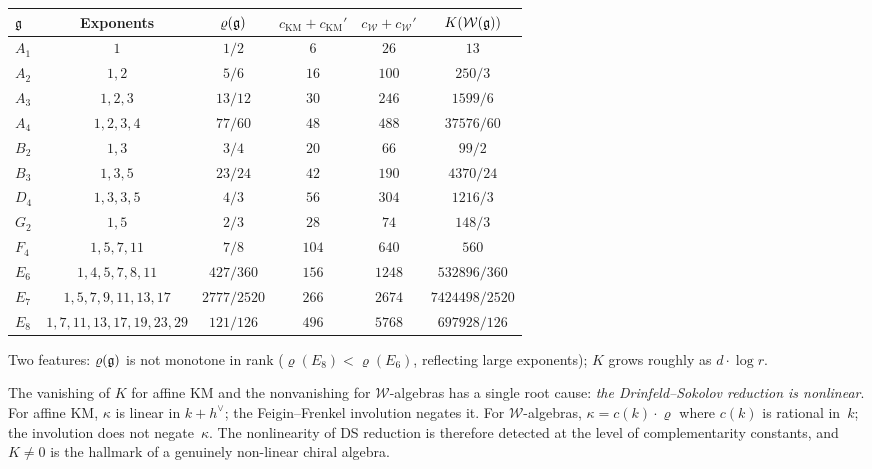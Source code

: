 \begin{computation}
\renewcommand{\arraystretch}{1.4}
\begin{center}
\begin{tabular}{lccccc}
\toprule
$\mathfrak{g}$ & Exponents & $\varrho(\mathfrak{g})$ & $c_{\mathrm{KM}}+c_{\mathrm{KM}}'$ &
$c_{\mathcal{W}}+c_{\mathcal{W}}'$ & $K(\mathcal{W}(\mathfrak{g}))$ \\
\midrule
$A_1$ & $1$ & $1/2$ & $6$ & $26$ & $13$ \\
$A_2$ & $1, 2$ & $5/6$ & $16$ & $100$ & $250/3$ \\
$A_3$ & $1, 2, 3$ & $13/12$ & $30$ & $246$ & $1599/6$ \\
$A_4$ & $1, 2, 3, 4$ & $77/60$ & $48$ & $488$ & $37576/60$ \\
$B_2$ & $1, 3$ & $3/4$ & $20$ & $66$ & $99/2$ \\
$B_3$ & $1, 3, 5$ & $23/24$ & $42$ & $190$ & $4370/24$ \\
$D_4$ & $1, 3, 3, 5$ & $4/3$ & $56$ & $304$ & $1216/3$ \\
$G_2$ & $1, 5$ & $2/3$ & $28$ & $74$ & $148/3$ \\
$F_4$ & $1, 5, 7, 11$ & $7/8$ & $104$ & $640$ & $560$ \\
$E_6$ & $1, 4, 5, 7, 8, 11$ & $427/360$ & $156$ & $1248$ & $532896/360$ \\
$E_7$ & $1, 5, 7, 9, 11, 13, 17$ & $2777/2520$ & $266$ & $2674$ & $7424498/2520$ \\
$E_8$ & $1, 7, 11, 13, 17, 19, 23, 29$ & $121/126$ & $496$ & $5768$ & $697928/126$ \\
\bottomrule
\end{tabular}
\end{center}
Two features: $\varrho(\mathfrak{g})$ is not monotone in rank
($\varrho(E_8) < \varrho(E_6)$, reflecting large exponents);
$K$ grows roughly as $d \cdot \log r$.
\end{computation}

\begin{remark}[Structural content of $K = 0$ vs.\ $K \neq 0$]
The vanishing of $K$ for affine KM and the nonvanishing for
$\mathcal{W}$-algebras has a single root cause:
\emph{the Drinfeld--Sokolov reduction is nonlinear}.
For affine KM, $\kappa$ is linear in $k + h^\vee$; the
Feigin--Frenkel involution negates it.
For $\mathcal{W}$-algebras, $\kappa = c(k) \cdot \varrho$ where
$c(k)$ is rational in~$k$; the involution does not negate~$\kappa$.
The nonlinearity of DS reduction is therefore detected at the level
of complementarity constants, and $K \neq 0$ is the hallmark of a
genuinely non-linear chiral algebra.
\end{remark}

